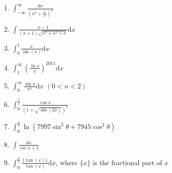 \documentclass[11pt, a4paper]{article}
\newcommand{\dd}{\mathrm{d}}
\begin{document}
\begin{enumerate}
    \item $\int_{-\infty}^{\infty} \frac{\dd x}{\left(x^3+\frac{1}{x^3}\right)^2}$ 
    \item$\int \frac{x-1}{(x+1)\sqrt{x^3+x^2+x}} \dd x$ 
    \item $\int_0^1 \frac{x}{\sin(x)} \dd x$ 
    \item $\int_1^{\infty} \left(\frac{\ln{x}}{x}\right)^{2011} \dd x$
    \item $\int_0^{\infty} \frac{\sin{x}}{x^n} \dd x$  $(0<n<2)$ 
    \item $\int_0^{\frac{\pi}{2}} \frac{\cos{x}}{(1+\sqrt{\sin(2x)})^2}$
    \item $\int_0^{\frac{\pi}{2}} \ln(7997\sin^2{\theta}+7945\cos^2{\theta})$  %
    \item $\int \frac{\dd x}{\csc{x}+1}$ 
    \item $\int_0^{\frac{\pi}{2}} \frac{\{\tan(x)\}}{\tan(x)} \dd x$, where $\{x\}$ is the fractional part of $x$ 

\end{enumerate}
\end{document}
